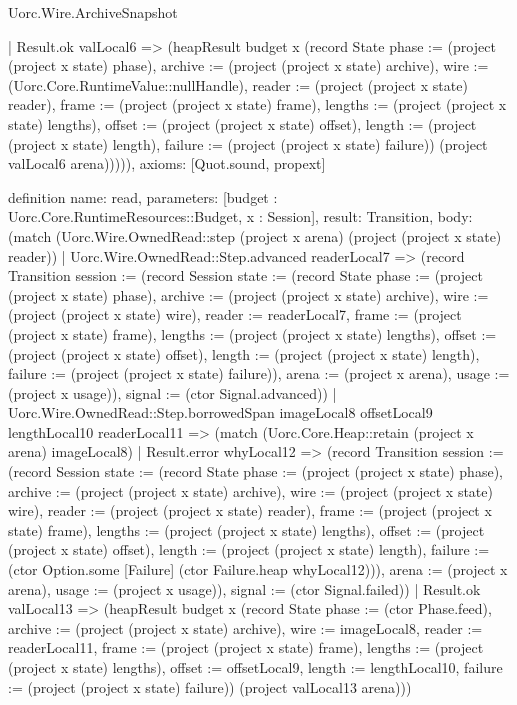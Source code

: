 \begin{lexlean}{Uorc.Wire.ArchiveSnapshot}
\begin{semanticmodule}
{    | Result.ok valLocal6 => (heapResult budget x (record State {phase := (project (project x state) phase), archive := (project (project x state) archive), wire := (Uorc.Core.RuntimeValue::nullHandle), reader := (project (project x state) reader), frame := (project (project x state) frame), lengths := (project (project x state) lengths), offset := (project (project x state) offset), length := (project (project x state) length), failure := (project (project x state) failure)}) (project valLocal6 arena))))),
  axioms: [Quot.sound, propext]
}

definition{
  name: read,
  parameters: [budget : Uorc.Core.RuntimeResources::Budget, x : Session],
  result: Transition,
  body: (match (Uorc.Wire.OwnedRead::step (project x arena) (project (project x state) reader))
    | Uorc.Wire.OwnedRead::Step.advanced readerLocal7 => (record Transition {session := (record Session {state := (record State {phase := (project (project x state) phase), archive := (project (project x state) archive), wire := (project (project x state) wire), reader := readerLocal7, frame := (project (project x state) frame), lengths := (project (project x state) lengths), offset := (project (project x state) offset), length := (project (project x state) length), failure := (project (project x state) failure)}), arena := (project x arena), usage := (project x usage)}), signal := (ctor Signal.advanced)})
    | Uorc.Wire.OwnedRead::Step.borrowedSpan imageLocal8 offsetLocal9 lengthLocal10 readerLocal11 => (match (Uorc.Core.Heap::retain (project x arena) imageLocal8)
      | Result.error whyLocal12 => (record Transition {session := (record Session {state := (record State {phase := (project (project x state) phase), archive := (project (project x state) archive), wire := (project (project x state) wire), reader := (project (project x state) reader), frame := (project (project x state) frame), lengths := (project (project x state) lengths), offset := (project (project x state) offset), length := (project (project x state) length), failure := (ctor Option.some [Failure] (ctor Failure.heap whyLocal12))}), arena := (project x arena), usage := (project x usage)}), signal := (ctor Signal.failed)})
      | Result.ok valLocal13 => (heapResult budget x (record State {phase := (ctor Phase.feed), archive := (project (project x state) archive), wire := imageLocal8, reader := readerLocal11, frame := (project (project x state) frame), lengths := (project (project x state) lengths), offset := offsetLocal9, length := lengthLocal10, failure := (project (project x state) failure)}) (project valLocal13 arena)))
}
\end{semanticmodule}
\end{lexlean}
